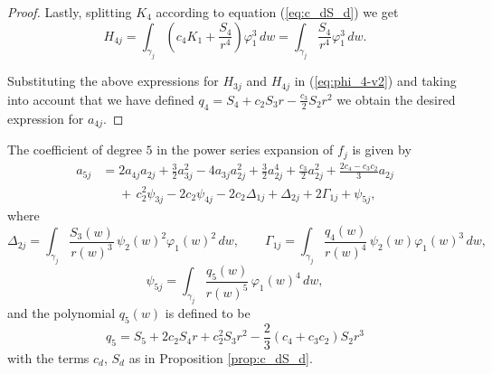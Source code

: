 \begin{proof}
Lastly, splitting $K_4$ according to equation (\ref{eq:c_dS_d}) we get
\[ H_{4j}=\int_{\gamma_j}\left(c_4K_1+\frac{S_4}{r^4}\right)\varphi_1^3\,dw=\int_{\gamma_j}\frac{S_4}{r^4}\varphi_1^3\,dw. \]

Substituting the above expressions for $H_{3j}$ and $H_{4j}$ in (\ref{eq:phi_4-v2}) and taking into account that we have defined $q_4=S_4+c_2S_3r-\frac{c_3}{2}S_2r^2$ we obtain the desired expression for $a_{4j}$. 
\end{proof}





\begin{proposition}\label{prop:fifthvar}
The coefficient of degree $5$ in the power series expansion of $f_j$ is given by
\begin{align*}
a_{5j}	&= 2a_{4j}a_{2j}+\frac{3}{2}a_{3j}^2-4a_{3j}a_{2j}^2+\frac{3}{2}a_{2j}^4+ \frac{c_3}{2}a_{2j}^2+\frac{2c_4-c_3c_2}{3}a_{2j} \\
	&\phantom{=} +\,c_2^2\psi_{3j}-2c_2\psi_{4j}-2c_2\Delta_{1j}+\Delta_{2j}+2\Gamma_{1j}+\psi_{5j}, 
\end{align*}
where 
\[ \Delta_{2j} = \int_{\gamma_j}\frac{S_3(w)}{r(w)^3}\,\psi_2(w)^2\varphi_1(w)^2\,dw, \qquad \Gamma_{1j} = \int_{\gamma_j}\frac{q_4(w)}{r(w)^4}\,\psi_2(w)\varphi_1(w)^3\,dw, \]
\[\psi_{5j} = \int_{\gamma_j}\frac{q_5(w)}{r(w)^5}\,\varphi_1(w)^4\,dw, \]
and the polynomial $q_5(w)$ is defined to be
\[ q_5=S_5+2c_2S_4r+c_2^2S_3r^2-\frac{2}{3}(c_4+c_3c_2)S_2r^3  \]
with the terms $c_d$, $S_d$ as in Proposition \textnormal{\ref{prop:c_dS_d}}.
\end{proposition}

